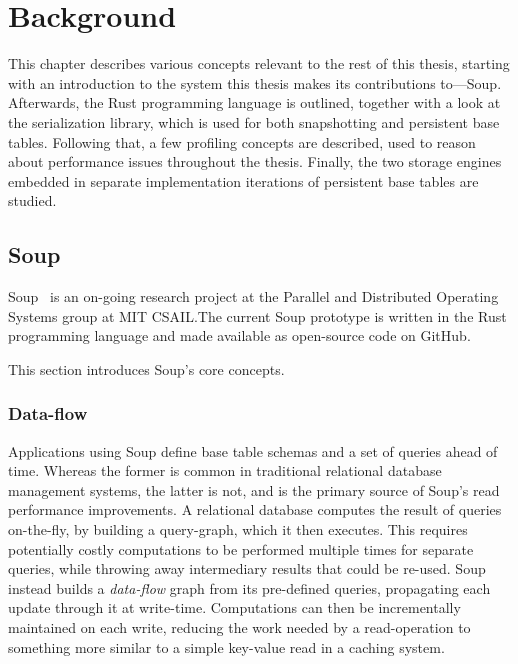 \chapter{Background}\label{chap:background}

This chapter describes various concepts relevant to the rest of this thesis,
starting with an introduction to the system this thesis makes its contributions
to---Soup. Afterwards, the Rust programming language is outlined, together with a
look at the  serialization library, which is used for both
snapshotting and persistent base tables. Following that, a few profiling
concepts are described, used to reason about performance issues throughout the
thesis. Finally, the two storage engines embedded in separate implementation
iterations of persistent base tables are studied.


\newpage

\section{Soup}

Soup~\cite{xylem} is an on-going research project at the Parallel and Distributed Operating
Systems group at MIT CSAIL.\@ The current Soup
prototype is written in the Rust programming language and made available as
open-source code on GitHub.

This section introduces Soup's core concepts.

\subsection{Data-flow}

Applications using Soup define base table schemas and a set of queries ahead of
time. Whereas the former is common in traditional relational database management
systems, the latter is not, and is the primary source of Soup's read performance
improvements. A relational database computes the result of queries on-the-fly,
by building a query-graph, which it then executes. This requires potentially
costly computations to be performed multiple times for separate queries, while
throwing away intermediary results that could be re-used. Soup instead builds a
\textit{data-flow} graph from its pre-defined queries, propagating each update
through it at write-time. Computations can then be incrementally maintained on
each write, reducing the work needed by a read-operation to something more
similar to a simple key-value read in a caching system.

